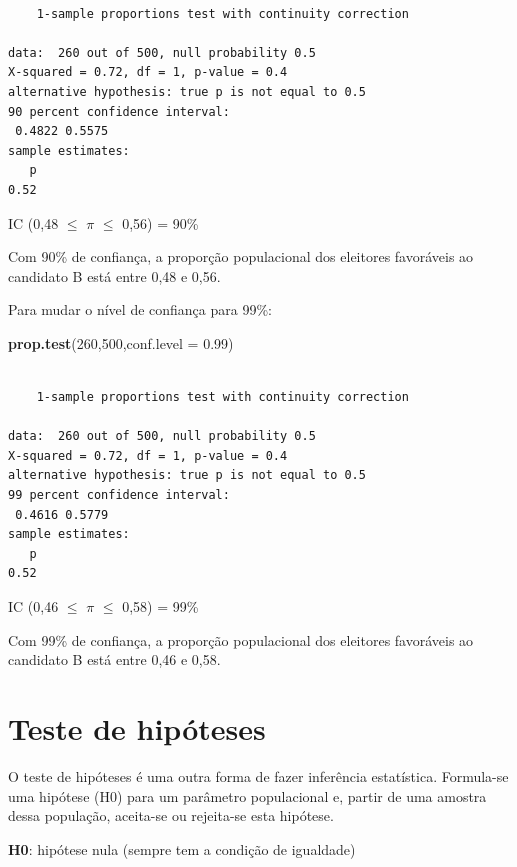 \documentclass[12pt,portuguese,oneside]{book}
\newenvironment{Shaded}{\begin{snugshade}}{\end{snugshade}}
\newcommand{\KeywordTok}[1]{\textcolor[rgb]{0.13,0.29,0.53}{\textbf{#1}}}
\newcommand{\DataTypeTok}[1]{\textcolor[rgb]{0.13,0.29,0.53}{#1}}
\newcommand{\DecValTok}[1]{\textcolor[rgb]{0.00,0.00,0.81}{#1}}
\newcommand{\FloatTok}[1]{\textcolor[rgb]{0.00,0.00,0.81}{#1}}
\newcommand{\NormalTok}[1]{#1}
\begin{document}
\begin{verbatim}

    1-sample proportions test with continuity correction

data:  260 out of 500, null probability 0.5
X-squared = 0.72, df = 1, p-value = 0.4
alternative hypothesis: true p is not equal to 0.5
90 percent confidence interval:
 0.4822 0.5575
sample estimates:
   p 
0.52 
\end{verbatim}

IC (0,48 \(\leq\) \(\pi\) \(\leq\) 0,56) = 90\%

Com 90\% de confiança, a proporção populacional dos eleitores favoráveis
ao candidato B está entre 0,48 e 0,56.

Para mudar o nível de confiança para 99\%:

\begin{Shaded}
\begin{Highlighting}[]
\KeywordTok{prop.test}\NormalTok{(}\DecValTok{260}\NormalTok{,}\DecValTok{500}\NormalTok{,}\DataTypeTok{conf.level =} \FloatTok{0.99}\NormalTok{)}
\end{Highlighting}
\end{Shaded}

\begin{verbatim}

    1-sample proportions test with continuity correction

data:  260 out of 500, null probability 0.5
X-squared = 0.72, df = 1, p-value = 0.4
alternative hypothesis: true p is not equal to 0.5
99 percent confidence interval:
 0.4616 0.5779
sample estimates:
   p 
0.52 
\end{verbatim}

IC (0,46 \(\leq\) \(\pi\) \(\leq\) 0,58) = 99\%

Com 99\% de confiança, a proporção populacional dos eleitores favoráveis
ao candidato B está entre 0,46 e 0,58.

\section{Teste de hipóteses}\label{teste-de-hipoteses}

O teste de hipóteses é uma outra forma de fazer inferência estatística.
Formula-se uma hipótese (H0) para um parâmetro populacional e, partir de
uma amostra dessa população, aceita-se ou rejeita-se esta hipótese.

\textbf{H0}: hipótese nula (sempre tem a condição de igualdade)
\end{document}
